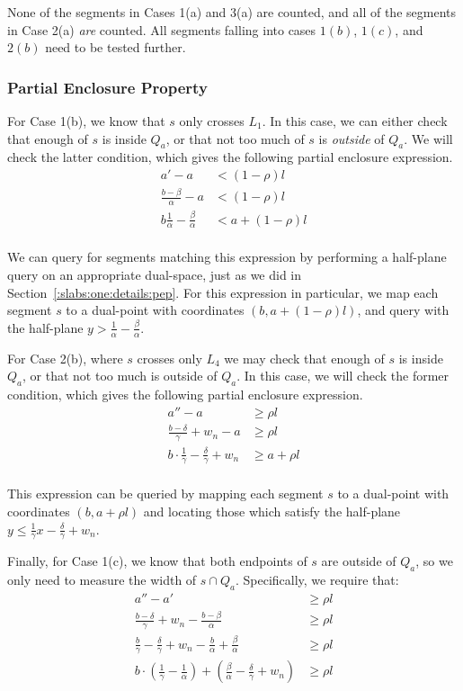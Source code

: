 None of the segments in Cases 1(a) and 3(a) are counted, and all of the segments in Case 2(a) \emph{are} counted. All segments falling into cases $1(b)$, $1(c)$, and $2(b)$ need to be tested further.


\subsubsection{Partial Enclosure Property}

For Case 1(b), we know that $s$ only crosses $L_1$. In this case, we can either check that enough of $s$ is inside $Q_a$, or that not too much of $s$ is \emph{outside} of $Q_a$.  
We will check the latter condition, which gives the following partial enclosure expression.
\[
\begin{split}
a' - a &< (1 - \rho)l \\
%
\frac{b - \beta}{\alpha} - a &< (1 - \rho)l \\
%
b \frac{1}{\alpha} - \frac{\beta}{\alpha} &< a + (1 - \rho)l \\
%
\end{split}
\]

We can query for segments matching this expression by performing a half-plane query on an appropriate dual-space, just as we did in Section~\ref{:slabs:one:details:pep}. 
For this expression in particular, we map each segment $s$ to a dual-point with coordinates $(b, a + (1-\rho)l)$, and query with the half-plane $y > \frac{1}{\alpha} - \frac{\beta}{\alpha}$.

For Case 2(b), where $s$ crosses only $L_4$ we may check that enough of $s$ is inside $Q_a$, or that not too much is outside of $Q_a$. In this case, we will check the former condition, which gives the following partial enclosure expression.
\[
\begin{split}
a'' - a &\geq \rho l \\
%
\frac{b - \delta}{\gamma} + w_n - a &\geq \rho l \\
%
b \cdot \frac{1}{\gamma} - \frac{\delta}{\gamma} + w_n &\geq a + \rho l \\
%
\end{split}
\]

This expression can be queried by mapping each segment $s$ to a dual-point with coordinates $(b, a + \rho l)$ and locating those which satisfy the half-plane $y \leq \frac{1}{\gamma} x - \frac{\delta}{\gamma} + w_n$.

Finally, for Case 1(c), we know that both endpoints of $s$ are outside of $Q_a$, so we only need to measure the width of $s \cap Q_a$.  Specifically, we require that:
\[
\begin{split} 
a'' - a' &\geq \rho l \\
%
\frac{b - \delta}{\gamma} + w_n - \frac{b - \beta}{\alpha} &\geq \rho l \\
%
\frac{b}{\gamma} - \frac{\delta}{\gamma} + w_n - \frac{b}{\alpha} + \frac{\beta}{\alpha} &\geq \rho l \\
%
b \cdot \left ( \frac{1}{\gamma} - \frac{1}{\alpha} \right ) + \left ( \frac{\beta}{\alpha} - \frac{\delta}{\gamma} + w_n \right ) &\geq \rho l \\
%
\end{split}
\]

